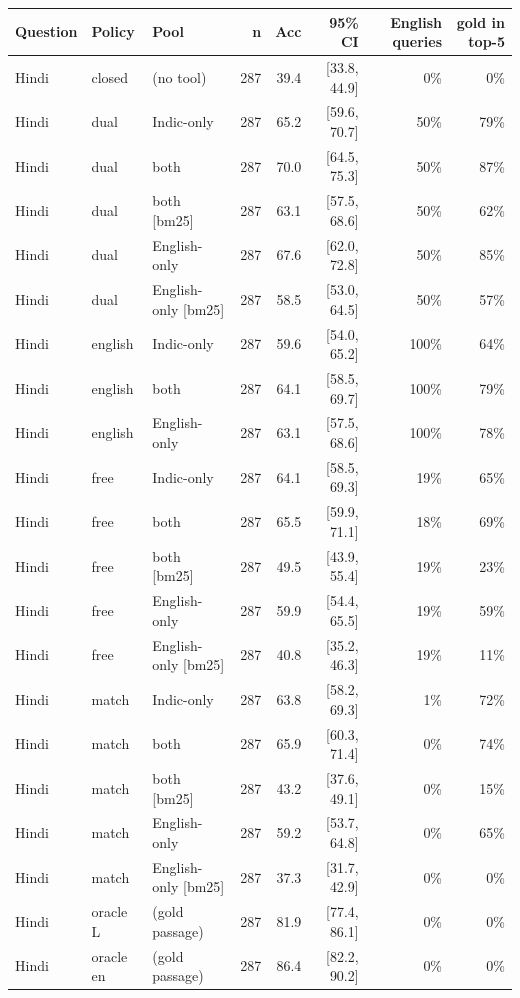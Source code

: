 \begin{table}[h]\centering\scriptsize
\begin{tabular}{lllrrrrr}
\toprule
Question & Policy & Pool & n & Acc & 95\% CI & English queries & gold in top-5 \\
\midrule
Hindi & closed & (no tool) & 287 & 39.4 & [33.8, 44.9] & 0\% & 0\% \\
Hindi & dual & Indic-only & 287 & 65.2 & [59.6, 70.7] & 50\% & 79\% \\
Hindi & dual & both & 287 & 70.0 & [64.5, 75.3] & 50\% & 87\% \\
Hindi & dual & both [bm25] & 287 & 63.1 & [57.5, 68.6] & 50\% & 62\% \\
Hindi & dual & English-only & 287 & 67.6 & [62.0, 72.8] & 50\% & 85\% \\
Hindi & dual & English-only [bm25] & 287 & 58.5 & [53.0, 64.5] & 50\% & 57\% \\
Hindi & english & Indic-only & 287 & 59.6 & [54.0, 65.2] & 100\% & 64\% \\
Hindi & english & both & 287 & 64.1 & [58.5, 69.7] & 100\% & 79\% \\
Hindi & english & English-only & 287 & 63.1 & [57.5, 68.6] & 100\% & 78\% \\
Hindi & free & Indic-only & 287 & 64.1 & [58.5, 69.3] & 19\% & 65\% \\
Hindi & free & both & 287 & 65.5 & [59.9, 71.1] & 18\% & 69\% \\
Hindi & free & both [bm25] & 287 & 49.5 & [43.9, 55.4] & 19\% & 23\% \\
Hindi & free & English-only & 287 & 59.9 & [54.4, 65.5] & 19\% & 59\% \\
Hindi & free & English-only [bm25] & 287 & 40.8 & [35.2, 46.3] & 19\% & 11\% \\
Hindi & match & Indic-only & 287 & 63.8 & [58.2, 69.3] & 1\% & 72\% \\
Hindi & match & both & 287 & 65.9 & [60.3, 71.4] & 0\% & 74\% \\
Hindi & match & both [bm25] & 287 & 43.2 & [37.6, 49.1] & 0\% & 15\% \\
Hindi & match & English-only & 287 & 59.2 & [53.7, 64.8] & 0\% & 65\% \\
Hindi & match & English-only [bm25] & 287 & 37.3 & [31.7, 42.9] & 0\% & 0\% \\
Hindi & oracle L & (gold passage) & 287 & 81.9 & [77.4, 86.1] & 0\% & 0\% \\
Hindi & oracle en & (gold passage) & 287 & 86.4 & [82.2, 90.2] & 0\% & 0\% \\

\end{tabular}
\end{table}
